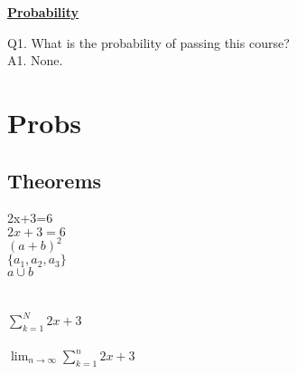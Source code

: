\documentclass{article}
\begin{document}
\begin{center}
\textbf{\underline{Probability}}
\end{center}
Q1. What is the probability of passing this course?
\\
A1. None.

\section{Probs}
\subsection{Theorems}

2x+3=6\\
$2x+3=6$\\
$(a+b)^{2}$\\
$\{a_{1}, a_{2}, a_{3}\}$\\
$a\cup b$\\\\\\
$\sum^{N}_{k=1} 2x+3 $\\\\
$\lim_{n\to\infty} \sum^{n}_{k=1} 2x+3$
\end{document}
